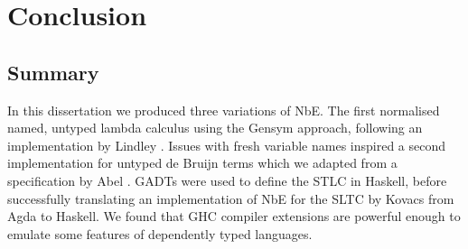 \chapter{Conclusion}
\label{chap:conclusion}


% 

\section{Summary}
In this dissertation we produced three variations of NbE. The first normalised named, untyped lambda calculus using the Gensym approach, following an implementation by Lindley \cite{slides}. Issues with fresh variable names inspired a second implementation for untyped de Bruijn terms which we adapted from a specification by Abel \cite{deBruijn}. GADTs were used to define the STLC in Haskell, before successfully translating an implementation of NbE for the SLTC by Kovacs \cite{AgdaNbe} from Agda to Haskell. We found that GHC compiler extensions are powerful enough to emulate some features of dependently typed languages.

